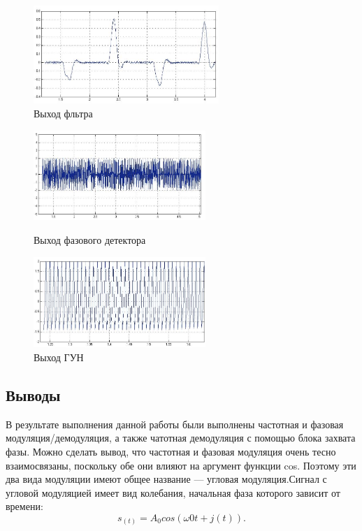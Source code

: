 \documentclass[10pt,a4paper]{article}
\begin{document}
\begin{figure}[h]\centering
    \includegraphics[width=7cm]{sim_fpll_filt} 
    \caption{Выход фльтра}\label{fig.sim_fpll_filt}
\end{figure}
\begin{figure}[h]\centering
  \parbox[b]{0.49\textwidth}{\centering
    \includegraphics[width=6.5cm]{sim_fpll_pd} 
    \caption{Выход фазового детектора}\label{fig.sim_fm}}
  \hfil\hfil 
  \begin{minipage}[b]{0.49\textwidth}
	\centering
	\includegraphics[width=6.5cm]{sim_fpll_vco}
	\caption{Выход ГУН}\label{fig.sim_fpll_vco} 
  \end{minipage}
\end{figure}

\FloatBarrier
\subsection{Выводы}
В результате выполнения данной работы были выполнены частотная и фазовая модуляция/демодуляция, а также чатотная демодуляция с  помощью блока захвата фазы. Можно сделать вывод, что частотная и фазовая модуляция очень тесно взаимосвязаны, поскольку обе они влияют на аргумент функции cos. Поэтому эти два вида модуляции имеют общее название — угловая модуляция.Сигнал с угловой модуляцией имеет вид колебания, начальная фаза которого зависит от времени:
	\begin{equation}
	s_(t) = A_0 cos(\omega0 t + j(t)).
	\end{equation}
\end{document}
